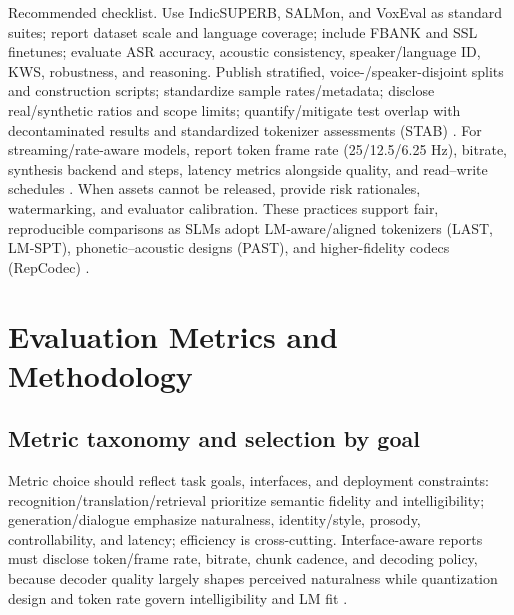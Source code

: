 \documentclass{article}
\begin{document}
Recommended checklist. Use IndicSUPERB, SALMon, and VoxEval as standard suites; report dataset scale and language coverage; include FBANK and SSL finetunes; evaluate ASR accuracy, acoustic consistency, speaker/language ID, KWS, robustness, and reasoning. Publish stratified, voice-/speaker-disjoint splits and construction scripts; standardize sample rates/metadata; disclose real/synthetic ratios and scope limits; quantify/mitigate test overlap with decontaminated results and standardized tokenizer assessments (STAB) \cite{vashishth2024stabspeechtokenizerassessmentbenchmark}. For streaming/rate-aware models, report token frame rate (25/12.5/6.25 Hz), bitrate, synthesis backend and steps, latency metrics alongside quality, and read–write schedules \cite{zhang2025impactframeratesspeechtokenizercasestudy}. When assets cannot be released, provide risk rationales, watermarking, and evaluator calibration. These practices support fair, reproducible comparisons as SLMs adopt LM‑aware/aligned tokenizers (LAST, LM‑SPT), phonetic–acoustic designs (PAST), and higher-fidelity codecs (RepCodec) \cite{turetzky2024lastlanguagemodelawarespeechtokenization,jo2025lmsptalignedsemanticdistillationspeechto,har-tuv2025pastphoneticacousticspeechtokenizer,huang2024repcodecspeechrepresentationcodectokeniz}.

















\section{Evaluation Metrics and Methodology} \label{sec:Evaluation Metrics and Methodology}

\subsection{Metric taxonomy and selection by goal} \label{subsec:Metric taxonomy and selection by goal}
Metric choice should reflect task goals, interfaces, and deployment constraints: recognition/translation/retrieval prioritize semantic fidelity and intelligibility; generation/dialogue emphasize naturalness, identity/style, prosody, controllability, and latency; efficiency is cross-cutting. Interface-aware reports must disclose token/frame rate, bitrate, chunk cadence, and decoding policy, because decoder quality largely shapes perceived naturalness while quantization design and token rate govern intelligibility and LM fit \cite{turetzky2024lastlanguagemodelawarespeechtokenization,zhang2025impactframeratesspeechtokenizercasestudy,li2024investigatingneuralaudiocodecsspeechlang}.
\end{document}
